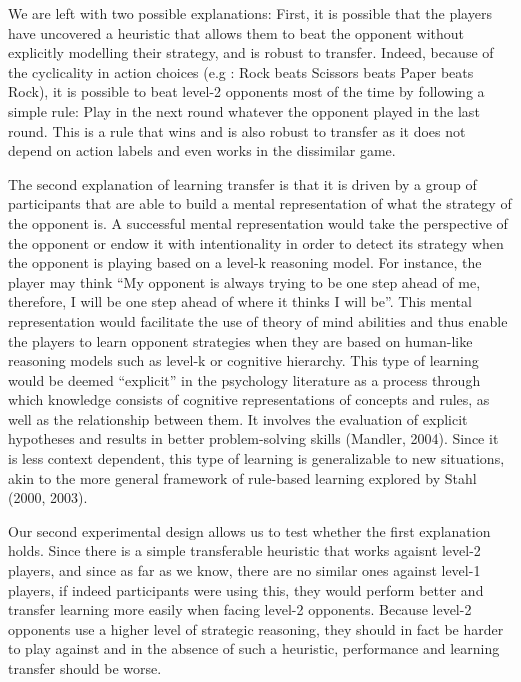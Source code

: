 \documentclass[man,floatsintext]{apa6}
\begin{document}
We are left with two possible explanations: First, it is possible that the players have uncovered a heuristic that allows them to beat the opponent without explicitly modelling their strategy, and is robust to transfer. Indeed, because of the cyclicality in action choices (e.g : Rock beats Scissors beats Paper beats Rock), it is possible to beat level-2 opponents most of the time by following a simple rule: Play in the next round whatever the opponent played in the last round. This is a rule that wins and is also robust to transfer as it does not depend on action labels and even works in the dissimilar game.

The second explanation of learning transfer is that it is driven by a group of participants that are able to build a mental representation of what the strategy of the opponent is. A successful mental representation would take the perspective of the opponent or endow it with intentionality in order to detect its strategy when the opponent is playing based on a level-k reasoning model. For instance, the player may think \enquote{My opponent is always trying to be one step ahead of me, therefore, I will be one step ahead of where it thinks I will be}. This mental representation would facilitate the use of theory of mind abilities and thus enable the players to learn opponent strategies when they are based on human-like reasoning models such as level-k or cognitive hierarchy. This type of learning would be deemed \enquote{explicit} in the psychology literature as a process through which knowledge consists of cognitive representations of concepts and rules, as well as the relationship between them. It involves the evaluation of explicit hypotheses and results in better problem-solving skills (Mandler, 2004). Since it is less context dependent, this type of learning is generalizable to new situations, akin to the more general framework of rule-based learning explored by Stahl (2000, 2003).

Our second experimental design allows us to test whether the first explanation holds. Since there is a simple transferable heuristic that works agaisnt level-2 players, and since as far as we know, there are no similar ones against level-1 players, if indeed participants were using this, they would perform better and transfer learning more easily when facing level-2 opponents. Because level-2 opponents use a higher level of strategic reasoning, they should in fact be harder to play against and in the absence of such a heuristic, performance and learning transfer should be worse.
\end{document}
